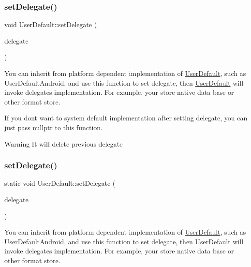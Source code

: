 \subsubsection{\texorpdfstring{set\+Delegate()}{setDelegate()}\hspace{0.1cm}{\footnotesize\ttfamily [1/2]}}
{\footnotesize\ttfamily void User\+Default\+::set\+Delegate (\begin{DoxyParamCaption}\item[{\hyperlink{classUserDefault}{User\+Default} $\ast$}]{delegate }\end{DoxyParamCaption})\hspace{0.3cm}{\ttfamily [static]}}

You can inherit from platform dependent implementation of \hyperlink{classUserDefault}{User\+Default}, such as User\+Default\+Android, and use this function to set delegate, then \hyperlink{classUserDefault}{User\+Default} will invoke delegate\textquotesingle{}s implementation. For example, your store native data base or other format store.

If you don\textquotesingle{}t want to system default implementation after setting delegate, you can just pass nullptr to this function.

\begin{DoxyWarning}{Warning}
It will delete previous delegate 
\end{DoxyWarning}
\mbox{\label{classUserDefault_acec4ac956094abe97f52755eccf26e2e}} 
\subsubsection{\texorpdfstring{set\+Delegate()}{setDelegate()}\hspace{0.1cm}{\footnotesize\ttfamily [2/2]}}
{\footnotesize\ttfamily static void User\+Default\+::set\+Delegate (\begin{DoxyParamCaption}\item[{\hyperlink{classUserDefault}{User\+Default} $\ast$}]{delegate }\end{DoxyParamCaption})\hspace{0.3cm}{\ttfamily [static]}}

You can inherit from platform dependent implementation of \hyperlink{classUserDefault}{User\+Default}, such as User\+Default\+Android, and use this function to set delegate, then \hyperlink{classUserDefault}{User\+Default} will invoke delegate\textquotesingle{}s implementation. For example, your store native data base or other format store.

